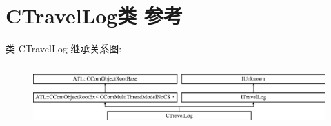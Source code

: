 \hypertarget{class_c_travel_log}{}\section{C\+Travel\+Log类 参考}
\label{class_c_travel_log}
类 C\+Travel\+Log 继承关系图\+:\begin{figure}[H]
\begin{center}
\leavevmode
\includegraphics[height=2.386364cm]{class_c_travel_log}
\end{center}
\end{figure}
